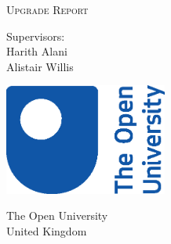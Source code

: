 \begin{titlepage}
    \begin{center}
        \vspace*{1cm}
            
        \Huge
        \textbf{\thetitle}
            
        \vspace{0.5cm}
        \Large
        \makeatletter \@subtitle \makeatother %
        \vspace{1.5cm}
        
        \textsc{Upgrade Report}
            
        \vfill
            
        \textbf{\theauthor}
            
        \vspace{1cm}
            
        Supervisors:\\
        Harith Alani\\
        Alistair Willis
            
        \vspace{0.8cm}
            
        \includegraphics[width=0.4\textwidth]{assets/OU-logo-2017.eps}
        \vspace{1.6cm}
        
        \centering
        \usebox{\largestimage}
        \hfill
        
        \vspace{0.8cm}
            
        \Large
        The Open University\\
        United Kingdom\\
        \thedate
            
    \end{center}
\end{titlepage}